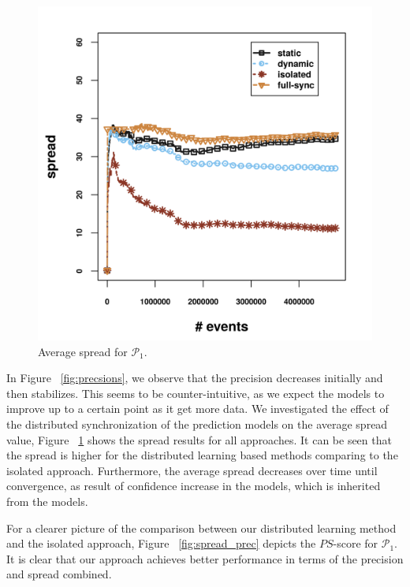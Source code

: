 
\begin{center}
	
	\begin{figure}[H]
		\centering
		\includegraphics[width=\textwidth,height=.9\textwidth,keepaspectratio]{chapters/figures/synopses/new/spread_p1.png}
		
		\caption{Average spread for $\mathcal{P}_1$.}
		\label{fig:spread}
	\end{figure}
\end{center}

\par In Figure ~\ref{fig:precsions}, we observe that the precision decreases initially and then stabilizes. This seems to be counter-intuitive, as we expect the models to improve up to a certain point as it get more data. We  investigated the effect of the distributed synchronization of the prediction models on the average spread value, Figure  ~\ref{fig:spread}  shows the spread results for all approaches. It can be seen that the spread is higher for the distributed learning based methods comparing to the isolated approach. Furthermore, the average spread decreases over time until convergence, as result of confidence increase in the models, which is inherited from the \pmcmr models. 

\par For a clearer picture of the comparison between our distributed learning method and the isolated approach, Figure ~\ref{fig:spread_prec} depicts the $PS$-score for $\mathcal{P}_1$. It is clear that our approach achieves better performance in terms of the precision and spread combined.  


